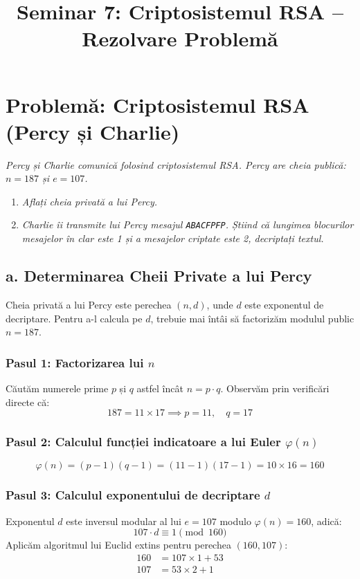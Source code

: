 \documentclass[12pt]{article}
\title{Seminar 7: Criptosistemul RSA -- Rezolvare Problemă}
\author{}
\date{} %
\begin{document}
\maketitle

\section*{Problemă: Criptosistemul RSA (Percy și Charlie)}

\textit{Percy și Charlie comunică folosind criptosistemul RSA. Percy are cheia publică: $n = 187$ și $e = 107$.}
\begin{enumerate}
    \item[a.] \textit{Aflați cheia privată a lui Percy.}
    \item[b.] \textit{Charlie îi transmite lui Percy mesajul \texttt{ABACFPFP}. Știind că lungimea blocurilor mesajelor în clar este 1 și a mesajelor criptate este 2, decriptați textul.}
\end{enumerate}



\subsection*{a. Determinarea Cheii Private a lui Percy}

Cheia privată a lui Percy este perechea $(n, d)$, unde $d$ este exponentul de decriptare. Pentru a-l calcula pe $d$, trebuie mai întâi să factorizăm modulul public $n = 187$.

\subsubsection*{Pasul 1: Factorizarea lui $n$}
Căutăm numerele prime $p$ și $q$ astfel încât $n = p \cdot q$. Observăm prin verificări directe că:
\[
187 = 11 \times 17 \implies p = 11, \quad q = 17
\]

\subsubsection*{Pasul 2: Calculul funcției indicatoare a lui Euler $\varphi(n)$}
\[
\varphi(n) = (p - 1)(q - 1) = (11 - 1)(17 - 1) = 10 \times 16 = 160
\]

\subsubsection*{Pasul 3: Calculul exponentului de decriptare $d$}
Exponentul $d$ este inversul modular al lui $e = 107$ modulo $\varphi(n) = 160$, adică:
\[
107 \cdot d \equiv 1 \pmod{160}
\]
Aplicăm algoritmul lui Euclid extins pentru perechea $(160, 107)$:
\begin{align*}
160 &= 107 \times 1 + 53 \\
107 &= 53 \times 2 + 1
\end{align*}
\end{document}
